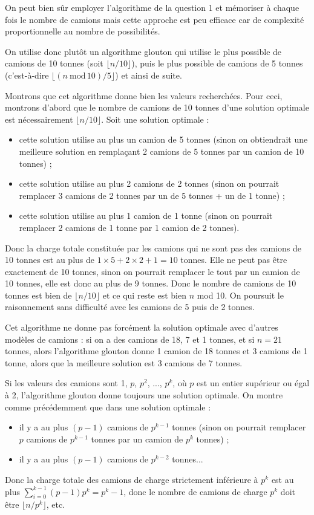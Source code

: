 \Q
On peut bien sûr employer l'algorithme de la question 1 et mémoriser à chaque fois le nombre de camions mais cette approche est peu efficace car de complexité proportionnelle au nombre de possibilités.
\medskip

On utilise donc plutôt un algorithme glouton qui utilise le plus possible de camions de 10 tonnes (soit $\lfloor n/10 \rfloor$), puis le plus possible de camions de 5 tonnes (c'est-à-dire $\lfloor (n\ \textrm{mod}\,10)/5\rfloor$) et ainsi de suite.



Montrons que cet algorithme donne bien les valeurs recherchées. Pour ceci, montrons d'abord que le nombre de camions de 10 tonnes d'une solution optimale est nécessairement $\lfloor n/10 \rfloor$. Soit une solution optimale :
\begin{itemize}
    \item cette solution utilise au plus un camion de 5 tonnes (sinon on obtiendrait une meilleure solution en remplaçant 2 camions de 5 tonnes par un camion de 10 tonnes) ;
    \item cette solution utilise au plus 2 camions de 2 tonnes (sinon on pourrait remplacer 3 camions de 2 tonnes par un de 5 tonnes + un de 1 tonne) ;
    \item cette solution utilise au plus 1 camion de 1 tonne (sinon on pourrait remplacer 2 camions de 1 tonne par 1 camion de 2 tonnes).
\end{itemize}
Donc la charge totale constituée par les camions qui ne sont pas des camions de 10 tonnes est au plus de $1\times5 + 2\times2 + 1=10$ tonnes. Elle ne peut pas être exactement de 10 tonnes, sinon on pourrait remplacer le tout par un camion de 10 tonnes, elle est donc au plus de 9 tonnes. Donc le nombre de camions de 10 tonnes est bien de $\lfloor n/10 \rfloor$ et ce qui reste est bien $n$ mod 10. On poursuit le raisonnement sans difficulté avec les camions de 5 puis de 2 tonnes.
\medskip

Cet algorithme ne donne pas forcément la solution optimale avec d'autres modèles de camions : si on a des camions de 18, 7 et 1 tonnes, et si $n=21$ tonnes, alors l'algorithme glouton donne 1 camion de 18 tonnes et 3 camions de 1 tonne, alors que la meilleure solution est 3 camions de 7 tonnes.
\medskip

Si les valeurs des camions sont 1, $p$, $p^2$, ..., $p^k$, où $p$ est un entier supérieur ou égal à 2, l'algorithme glouton donne toujours une solution optimale. On montre comme précédemment que dans une solution optimale :
\begin{itemize}
    \item il y a au plus $(p-1)$ camions de $p^{k-1}$ tonnes (sinon on pourrait remplacer $p$ camions de $p^{k-1}$ tonnes par un camion de $p^k$ tonnes) ;
    \item il y a au plus $(p-1)$ camions de $p^{k-2}$ tonnes...
\end{itemize}
\newpage

Donc la charge totale des camions de charge strictement inférieure à $p^k$ est au plus $\sum_{i=0}^{k-1}(p-1)p^k=p^k-1$, donc le nombre de camions de charge $p^k$ doit être $\lfloor n/p^k \rfloor$, etc.
\bigskip

\Fin
